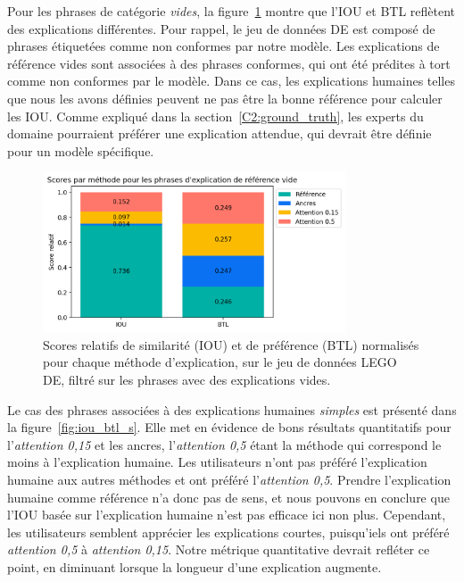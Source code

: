 Pour les phrases de catégorie \textit{vides}, la figure~\ref{fig:iou_btl_e} montre que l'IOU et BTL reflètent des explications différentes. Pour rappel, le jeu de données DE est composé de phrases étiquetées comme non conformes par notre modèle. Les explications de référence vides sont associées à des phrases conformes, qui ont été prédites à tort comme non conformes par le modèle. Dans ce cas, les explications humaines telles que nous les avons définies peuvent ne pas être la bonne référence pour calculer les IOU. Comme expliqué dans la section~\ref{C2:ground_truth}, les experts du domaine pourraient préférer une explication attendue, qui devrait être définie pour un modèle spécifique.

\begin{figure}[h!tpb]
  \setlength{\belowcaptionskip}{-0pt}
 \begin{center}
  \includegraphics[width=0.8\textwidth]{S3-Comparaison_de_methodes/figures/iou_btl_e.png}
  \caption{Scores relatifs de similarité (IOU) et de préférence (BTL) normalisés pour chaque méthode d'explication, sur le jeu de données LEGO DE, filtré sur les phrases avec des explications vides. }\label{fig:iou_btl_e}
 \end{center}
\end{figure}

Le cas des phrases associées à des explications humaines \textit{simples} est présenté dans la figure~\ref{fig:iou_btl_s}. Elle met en évidence de bons résultats quantitatifs pour l'\textit{attention 0,15} et les ancres, l'\textit{attention 0,5} étant la méthode qui correspond le moins à l'explication humaine. Les utilisateurs n'ont pas préféré l'explication humaine aux autres méthodes et ont préféré l'\textit{attention 0,5}. Prendre l'explication humaine comme référence n'a donc pas de sens, et nous pouvons en conclure que l'IOU basée sur l'explication humaine n'est pas efficace ici non plus. Cependant, les utilisateurs semblent apprécier les explications courtes, puisqu'iels ont préféré \textit{attention 0,5} à \textit{attention 0,15}. Notre métrique quantitative devrait refléter ce point, en diminuant lorsque la longueur d'une explication augmente.

